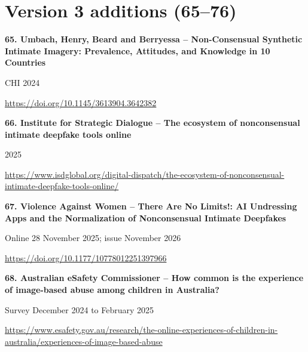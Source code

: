 \documentclass[11pt,a4paper]{article}
\begin{document}
\section*{Version 3 additions (65--76)}
\noindent\begin{minipage}{\linewidth}\textbf{65. Umbach, Henry, Beard and Berryessa -- Non-Consensual Synthetic Intimate Imagery: Prevalence, Attitudes, and Knowledge in 10 Countries}\par{\small CHI 2024\par\url{https://doi.org/10.1145/3613904.3642382}}\par\end{minipage}\par\vspace{2mm}
\noindent\begin{minipage}{\linewidth}\textbf{66. Institute for Strategic Dialogue -- The ecosystem of nonconsensual intimate deepfake tools online}\par{\small 2025\par\url{https://www.isdglobal.org/digital-dispatch/the-ecosystem-of-nonconsensual-intimate-deepfake-tools-online/}}\par\end{minipage}\par\vspace{2mm}
\noindent\begin{minipage}{\linewidth}\textbf{67. Violence Against Women -- There Are No Limits!: AI Undressing Apps and the Normalization of Nonconsensual Intimate Deepfakes}\par{\small Online 28 November 2025; issue November 2026\par\url{https://doi.org/10.1177/10778012251397966}}\par\end{minipage}\par\vspace{2mm}
\noindent\begin{minipage}{\linewidth}\textbf{68. Australian eSafety Commissioner -- How common is the experience of image-based abuse among children in Australia?}\par{\small Survey December 2024 to February 2025\par\url{https://www.esafety.gov.au/research/the-online-experiences-of-children-in-australia/experiences-of-image-based-abuse}}\par\end{minipage}\par\vspace{2mm}
\end{document}
